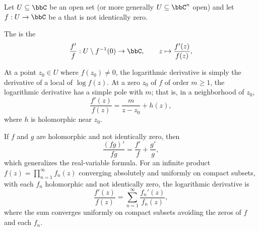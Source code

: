 \begin{definition} \label{definition:logarithmic_derivative_of_a_holomorphic_function_on_an_open_subset_of_the_complex_plane}
Let $U \subseteq \bbC$ be an open set (or more generally $U \subseteq \bbC^n$ open) and let $f : U \to \bbC$ be a  that is not identically zero.

The  is the 
$$
\frac{f'}{f} : U \setminus f^{-1}(0) \to \bbC, \qquad z \mapsto \frac{f'(z)}{f(z)},
$$

At a point $z_0 \in U$ where $f(z_0) \neq 0$, the logarithmic derivative is simply the derivative of a local  of $\log f(z)$. At a zero $z_0$ of $f$ of order $m \ge 1$, the logarithmic derivative has a simple pole with  $m$; that is, in a neighborhood of $z_0$,
$$
\frac{f'(z)}{f(z)} = \frac{m}{z - z_0} + h(z),
$$
where $h$ is holomorphic near $z_0$.

If $f$ and $g$ are holomorphic and not identically zero, then
$$
\frac{(fg)'}{fg} = \frac{f'}{f} + \frac{g'}{g},
$$
which generalizes the real-variable formula. For an infinite product $f(z) = \prod_{n=1}^\infty f_n(z)$ converging absolutely and uniformly on compact subsets, with each $f_n$ holomorphic and not identically zero, the logarithmic derivative is
$$
\frac{f'(z)}{f(z)} = \sum_{n=1}^\infty \frac{f_n'(z)}{f_n(z)},
$$
where the sum converges uniformly on compact subsets avoiding the zeros of $f$ and each $f_n$.
\end{definition}